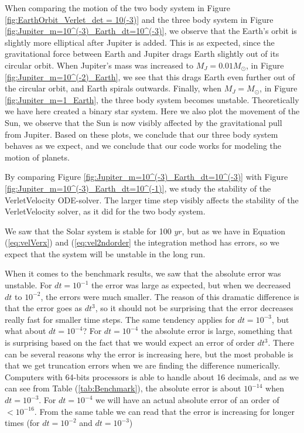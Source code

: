 \documentclass[norsk,a4paper,12pt]{article}
\begin{document}
{When comparing the motion of the two body system in Figure \ref{fig:EarthOrbit_Verlet_det = 10(-3)} and the three body system in Figure \ref{fig:Jupiter_m=10^(-3)_Earth_dt=10^(-3)}, we observe that the Earth's orbit is slightly more elliptical after Jupiter is added. This is as expected, since the gravitational force between Earth and Jupiter drags Earth slightly out of its circular orbit. When Jupiter's mass was increased to $M_J = 0.01 M_{\odot}$, in Figure \ref{fig:Jupiter_m=10^(-2)_Earth}, we see that this drags Earth even further out of the circular orbit, and Earth spirals outwards. Finally, when $M_J = M_{\odot}$, in Figure \ref{fig:Jupiter_m=1_Earth}, the three body system becomes unstable. Theoretically we have here created a binary star system. Here we also  plot the movement of the Sun, we observe that the Sun is now visibly affected by the gravitational pull from Jupiter. Based on these plots, we conclude that our three body system behaves as we expect, and we conclude that our code works for modeling the motion of planets.\par 
\vspace{3mm}

By comparing Figure \ref{fig:Jupiter_m=10^(-3)_Earth_dt=10^(-3)} with Figure \ref{fig:Jupiter_m=10^(-3)_Earth_dt=10^(-1)}, we study the stability of the VerletVelocity ODE-solver. The larger time step visibly affects the stability of the VerletVelocity solver, as it did for the two body system. 

We saw that the Solar system is stable for 100 $yr$, but as we have in Equation (\ref{eq:velVerx}) and (\ref{eq:vel2ndorder} the integration method has errors, so we expect that the system will be unstable in the long run. 

When it comes to the benchmark results, we saw that the absolute error was unstable. For $dt=10^{-1}$ the error was large as expected, but when we decreased $dt$ to $10^{-2}$, the errors were much smaller. The reason of this dramatic difference is that the error goes as $dt^3$, so it should not be surprising that the error decreases really fast for smaller time steps. The same tendency applies for $dt=10^{-3}$, but what about $dt=10^{-4}$? For $dt=10^{-4}$ the absolute error is large, something that is surprising based on the fact that we would expect an error of order $dt^3$. There can be several reasons why the error is increasing here, but the most probable is that we get truncation errors when we are finding the difference numerically. Computers with 64-bits processors is able to handle about 16 decimals, and as we can see from Table (\ref{tab:Benchmark}), the absolute error is about $10^{-14}$ when $dt=10^{-3}$. For $dt=10^{-4}$ we will have an actual absolute error of an order of $ <10^{-16}$. From the same table we can read that the error is increasing for longer times (for $dt=10^{-2}$ and $dt=10^{-3}$)


}
\end{document}
